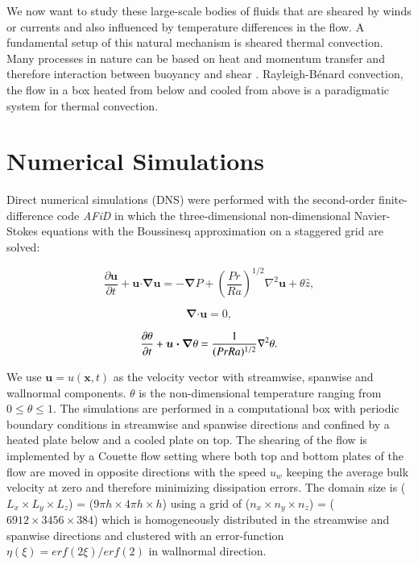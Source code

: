 \documentclass[final,5p,times,twocolumn]{elsarticle}
\begin{document}
We now want to study these large-scale bodies of fluids that are sheared by winds or currents and also influenced by temperature differences in the flow. A fundamental setup of this natural mechanism is sheared thermal convection. Many processes in nature can be based on heat and momentum transfer and therefore interaction between buoyancy \cite{ahl09} and shear \cite{smi11,bar07}. Rayleigh-B\'enard convection, the flow in a box heated from below and cooled from above is a paradigmatic system for thermal convection. 

\section{Numerical Simulations}
Direct numerical simulations (DNS) were performed with the second-order finite-difference
code \textit{AFiD} \cite{poe15c} in which the three-dimensional non-dimensional
Navier-Stokes equations with the Boussinesq approximation on a staggered grid are solved:

\begin{equation} %
\frac{\partial \boldsymbol{u}}{\partial t} + \boldsymbol{u} \bm{\cdot} \bm{\nabla} \boldsymbol{u} =-\bm{\nabla} P + \left(\frac{Pr}{Ra} \right)^{1/2} \nabla^2\boldsymbol{u}+\theta \hat{z}, 
\label{eqn:NS}
\end{equation}

\begin{equation} %
\bm{\nabla} \bm{\cdot} \boldsymbol{u} =0,
\label{eqn:div}
\end{equation}

\begin{equation} %
\frac{\partial \theta}{\partial t} + \boldsymbol{u} \bm{\cdot} \bm{\nabla} \theta = \frac{1}{(Pr Ra)^{1/2}} \nabla ^2 \theta.
\label{eqn:temp} \\[8pt]
\end{equation}

We use $ \boldsymbol{u}=u(\boldsymbol{x},t) $ as the velocity vector with streamwise, spanwise and wallnormal components. $ \theta $ is the non-dimensional temperature ranging from $ 0 \leq \theta \leq 1 $. The simulations are performed in a computational box with periodic boundary conditions in streamwise and spanwise directions and confined by a heated plate below and a cooled plate on top. The shearing of the flow is implemented by a Couette flow setting where both top and bottom plates of the flow are moved in opposite directions with the speed $ u_w $ keeping the average bulk velocity at zero and therefore minimizing dissipation errors. The domain size is ($ L_x \times L_y \times L_z $) = ($ 9\pi h \times 4\pi h \times h $) using a grid of ($ n_x \times n_y \times n_z $) = ($ 6912 \times 3456 \times 384 $) which is homogeneously distributed in the streamwise and spanwise directions and clustered with an error-function $ \eta(\xi)=erf(2\xi)/erf(2) $ in wallnormal direction.
\end{document}
